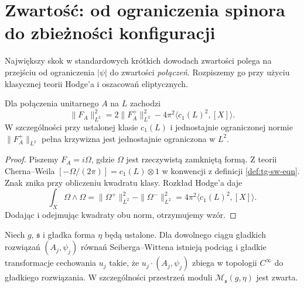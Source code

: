 \section{Zwartość: od ograniczenia spinora do zbieżności konfiguracji}
\label{sec:tg-sw12-compact}

Największy skok w standardowych krótkich dowodach
zwartości polega na przejściu od ograniczenia $|\psi|$
do zwartości \emph{połączeń}. Rozpiszemy go przy użyciu
klasycznej teorii Hodge'a i oszacowań eliptycznych.

\begin{lemat}
\label{lem:tg-sw12-curvature}
Dla połączenia unitarnego $A$ na $L$ zachodzi
\[
\|F_A\|_{L^2}^2=2\|F_A^+\|_{L^2}^2
-4\pi^2\langle c_1(L)^2,[X]\rangle.
\]
W szczególności przy ustalonej klasie $c_1(L)$
i jednostajnie ograniczonej normie $\|F_A^+\|_{L^2}$
pełna krzywizna jest jednostajnie ograniczona w $L^2$.
\end{lemat}

\begin{proof}
Piszemy $F_A=i\Omega$, gdzie $\Omega$ jest rzeczywistą
zamkniętą formą. Z teorii Cherna--Weila
$[-\Omega/(2\pi)]=c_1(L)\otimes1$
w konwencji z definicji \ref{def:tg-sw-eqn}.
Znak znika przy obliczeniu kwadratu klasy.
Rozkład Hodge'a daje
\[
\int_X\Omega\wedge\Omega
=\|\Omega^+\|_{L^2}^2-\|\Omega^-\|_{L^2}^2
=4\pi^2\langle c_1(L)^2,[X]\rangle.
\]
Dodając i odejmując kwadraty obu norm, otrzymujemy wzór.
\end{proof}

\begin{twierdzenie}
\label{thm:tg-sw12-compact}
Niech $g$, $\mathfrak s$ i gładka forma $\eta$ będą ustalone.
Dla dowolnego ciągu gładkich rozwiązań
$(A_j,\psi_j)$ równań Seiberga--Wittena istnieją podciąg
i gładkie transformacje cechowania $u_j$ takie, że
$u_j\cdot(A_j,\psi_j)$ zbiega w topologii $C^\infty$
do gładkiego rozwiązania. W szczególności przestrzeń
moduli $\mathcal M_{\mathfrak s}(g,\eta)$ jest zwarta.
\end{twierdzenie}

